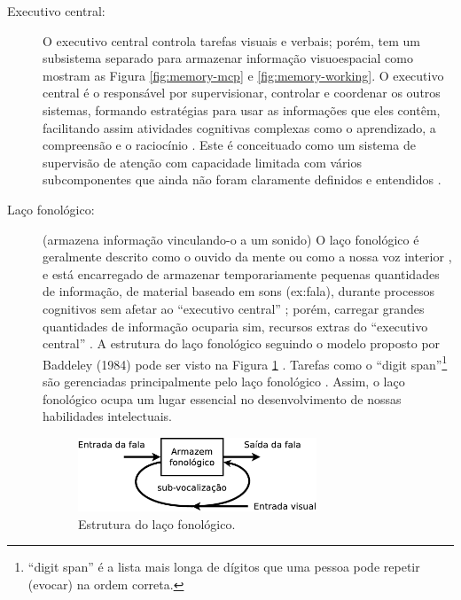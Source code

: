\begin{description}

\item[Executivo central:]
\label{reflabel:executivocentral}
O executivo central controla tarefas visuais e verbais; 
porém, tem um subsistema separado para armazenar informação visuoespacial 
\cite[pp. 273]{braisby2012cognitive} como mostram as Figura \ref{fig:memory-mcp} e \ref{fig:memory-working}.
O executivo central  é o responsável por supervisionar, 
controlar e coordenar os outros sistemas, 
formando estratégias para usar as informações que eles contêm,
facilitando assim atividades cognitivas complexas como o aprendizado, a compreensão e o raciocínio
\cite[pp. 272]{braisby2012cognitive} \cite[pp. 678]{spreen2006compendium} \cite[pp. 126]{pake2019psicologia}.
Este é conceituado como um sistema de supervisão de atenção com capacidade limitada
\cite[pp. 272, 281]{braisby2012cognitive} \cite[pp. 678]{spreen2006compendium}
com vários subcomponentes que ainda não foram claramente definidos e entendidos
\cite[pp. 285]{braisby2012cognitive}.


\item[Laço fonológico:] (armazena informação vinculando-o a um sonido)
\label{reflabel:fonologico}
O laço fonológico é geralmente descrito como o ouvido da mente ou como a nossa voz interior \cite[pp. 122]{pake2019psicologia}, 
e está encarregado de armazenar temporariamente pequenas quantidades de informação, 
de material baseado em sons (ex:fala), durante processos cognitivos
sem afetar ao ``executivo central'' 
\cite[pp. 678]{spreen2006compendium} \cite[pp. 272]{braisby2012cognitive} \cite[pp. 122]{pake2019psicologia};
porém, carregar grandes quantidades de informação ocuparia sim, recursos extras do ``executivo central''
\cite[pp. 272]{braisby2012cognitive}.
A estrutura do laço fonológico seguindo o modelo proposto por Baddeley (1984) pode ser visto na Figura  \ref{fig:lacofonologico}
\cite[pp. 276]{braisby2012cognitive}.
Tarefas como o ``digit span''\footnote{``digit span'' é a lista mais longa de dígitos que uma 
pessoa pode repetir (evocar) na ordem correta.} são gerenciadas principalmente pelo laço fonológico 
\cite[pp. 678]{spreen2006compendium}.
Assim, o laço fonológico ocupa um lugar essencial no desenvolvimento de nossas habilidades intelectuais. 
\begin{figure}[!h]
  \centering
    \includegraphics[width=0.7\textwidth]{chapters/cap-learning/fonologico.eps}
\caption{Estrutura do laço fonológico.}
\label{fig:lacofonologico}
\end{figure}


\end{description}
